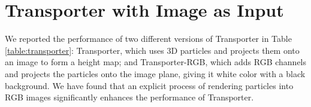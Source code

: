 \section{Transporter with Image as Input}\label{sec:transporter}
We reported the performance of two different versions of Transporter in Table \ref{table:transporter}: Transporter, which uses 3D particles and projects them onto an image to form a height map; and Transporter-RGB, which adds RGB channels and projects the particles onto the image plane, giving it white color with a black background. We have found that an explicit process of rendering particles into RGB images significantly enhances the performance of Transporter.

